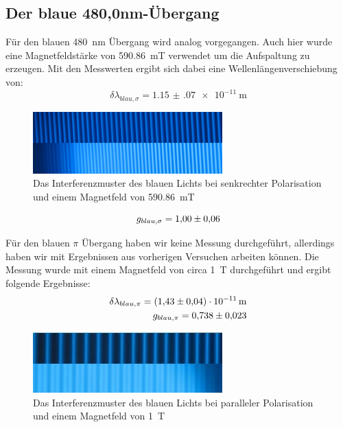 \subsection{Der blaue 480,0nm-Übergang}
Für den blauen \SI{480}{\nano\metre} Übergang wird analog vorgegangen. 
Auch hier wurde eine Magnetfeldstärke von \SI{590,86}{\milli\tesla} verwendet um die Aufspaltung zu erzeugen.
Mit den Messwerten ergibt sich dabei eine Wellenlängenverschiebung von:
\begin{equation*}
    \delta \lambda_{blau,\sigma} = \SI{1.15(07) e-11}{\metre} 
\end{equation*}

\begin{figure}
    \center
    \includegraphics[width=0.65\textwidth]{bilder/bearbeitet/blau_senk.jpg}
    \caption{Das Interferenzmuster des blauen Lichts bei senkrechter Polarisation und einem Magnetfeld von \SI{590,86}{\milli\tesla}}
    \label{fig:blau_senk}
\end{figure}

\begin{equation*}
    g_{blau,\sigma} = \num{1.00+-0.06}
\end{equation*}



Für den blauen $\pi$ Übergang haben wir keine Messung durchgeführt, allerdings haben wir mit Ergebnissen aus vorherigen Versuchen arbeiten können.
Die Messung wurde mit einem Magnetfeld von circa \SI{1}{\tesla} durchgeführt und ergibt folgende Ergebnisse:
\begin{align*}
    \delta \lambda_{blau,\pi} = \SI{1.43(04) e-11}{\metre} \\
    g_{blau,\pi} = \num{0.738+-0.023}
\end{align*}

\begin{figure}
    \center
    \includegraphics[width=0.65\textwidth]{bilder/bearbeitet/blau_parallel.jpeg}
    \caption{Das Interferenzmuster des blauen Lichts bei paralleler Polarisation und einem Magnetfeld von \SI{1}{\tesla}}
    \label{fig:blau_parallel}
\end{figure}
